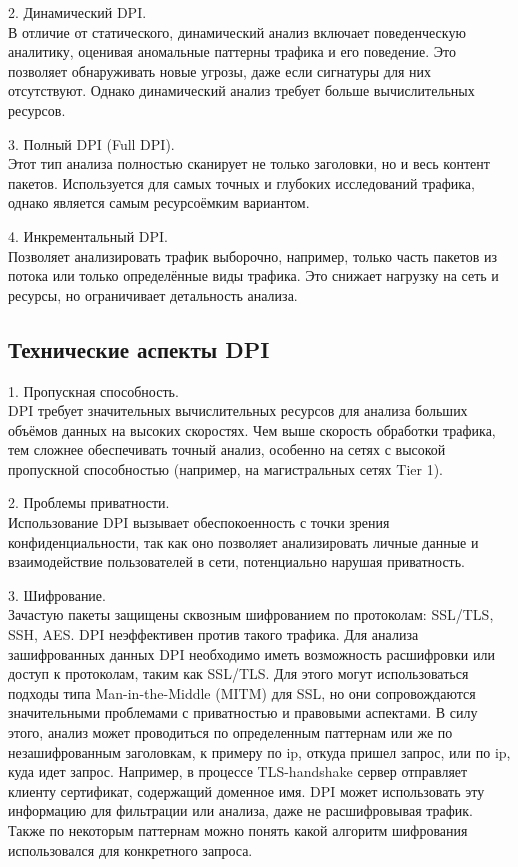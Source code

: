 \documentclass[utf8,14pt,a4paper,oneside,russian]{book}
\begin{document}
2. Динамический DPI.\\
В отличие от статического, динамический анализ включает поведенческую аналитику, оценивая аномальные паттерны трафика и его поведение.
Это позволяет обнаруживать новые угрозы, даже если сигнатуры для них отсутствуют. Однако динамический анализ требует больше вычислительных
ресурсов.

3. Полный DPI (Full DPI).\\
Этот тип анализа полностью сканирует не только заголовки, но и весь контент пакетов. Используется для самых точных и глубоких исследований
трафика, однако является самым ресурсоёмким вариантом.

4. Инкрементальный DPI.\\
Позволяет анализировать трафик выборочно, например, только часть пакетов из потока или только определённые виды трафика. Это снижает нагрузку
на сеть и ресурсы, но ограничивает детальность анализа.

\subsection{Технические аспекты DPI}

1. Пропускная способность.\\
DPI требует значительных вычислительных ресурсов для анализа больших объёмов данных на высоких скоростях. Чем выше скорость обработки трафика,
тем сложнее обеспечивать точный анализ, особенно на сетях с высокой пропускной способностью (например, на магистральных сетях Tier 1).

2. Проблемы приватности.\\
Использование DPI вызывает обеспокоенность с точки зрения конфиденциальности, так как оно позволяет анализировать личные данные и взаимодействие
пользователей в сети, потенциально нарушая приватность.

3. Шифрование.\\
Зачастую пакеты защищены сквозным шифрованием по протоколам: SSL/TLS, SSH, AES. DPI неэффективен против такого трафика. Для анализа
зашифрованных данных DPI необходимо иметь возможность расшифровки или доступ к протоколам, таким как SSL/TLS. Для этого могут использоваться
подходы типа Man-in-the-Middle (MITM) для SSL, но они сопровождаются значительными проблемами с приватностью и правовыми аспектами.
В силу этого, анализ может проводиться по определенным паттернам или же по незашифрованным заголовкам, к примеру по ip, откуда пришел запрос,
или по ip, куда идет запрос. Например, в процессе TLS-handshake сервер отправляет клиенту сертификат, содержащий доменное имя. DPI может
использовать эту информацию для фильтрации или анализа, даже не расшифровывая трафик. Также по некоторым паттернам можно понять какой алгоритм
шифрования использовался для конкретного запроса.
\end{document}

